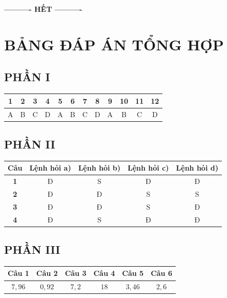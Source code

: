 \documentclass[12pt,a4paper]{article}
\begin{document}
\begin{center}
\textbf{---------- HẾT ----------}
\end{center}

\newpage
\section*{\large BẢNG ĐÁP ÁN TỔNG HỢP}

\subsection*{PHẦN I}
\begin{center}
\begin{tabular}{|c|c|c|c|c|c|c|c|c|c|c|c|}
\hline
\textbf{1} & \textbf{2} & \textbf{3} & \textbf{4} & \textbf{5} & \textbf{6} & \textbf{7} & \textbf{8} & \textbf{9} & \textbf{10} & \textbf{11} & \textbf{12} \\
\hline
A & B & C & D & A & B & C & D & A & B & C & D \\
\hline
\end{tabular}
\end{center}

\subsection*{PHẦN II}
\begin{center}
\begin{tabular}{|c|c|c|c|c|}
\hline
\textbf{Câu} & \textbf{Lệnh hỏi a)} & \textbf{Lệnh hỏi b)} & \textbf{Lệnh hỏi c)} & \textbf{Lệnh hỏi d)} \\
\hline
\textbf{1} & Đ & S & Đ & Đ \\
\hline
\textbf{2} & Đ & Đ & S & S \\
\hline
\textbf{3} & Đ & Đ & S & Đ \\
\hline
\textbf{4} & Đ & S & Đ & Đ \\
\hline
\end{tabular}
\end{center}

\subsection*{PHẦN III}
\begin{center}
\begin{tabular}{|c|c|c|c|c|c|}
\hline
\textbf{Câu 1} & \textbf{Câu 2} & \textbf{Câu 3} & \textbf{Câu 4} & \textbf{Câu 5} & \textbf{Câu 6} \\
\hline
$7{,}96$ & $0{,}92$ & $7{,}2$ & $18$ & $3{,}46$ & $2{,}6$ \\
\hline
\end{tabular}
\end{center}
\end{document}

